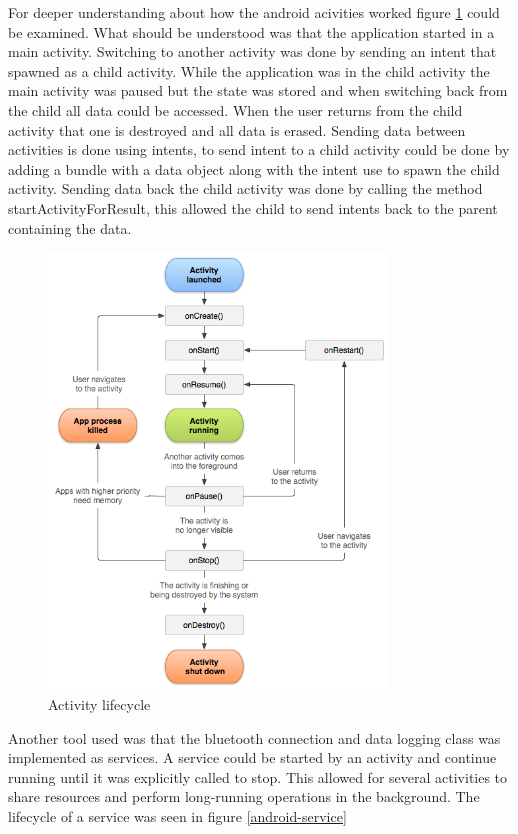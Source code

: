 For deeper understanding about how the android acivities\cite{activity} worked figure \ref{android-activity} could be examined. What should be understood was that the application started in a main activity. Switching to another activity was done by sending an intent that spawned as a child activity. While the application was in the child activity the main activity was paused but the state was stored and when switching back from the child all data could be accessed. When the user returns from the child activity that one is destroyed and all data is erased. Sending data between activities is done using intents, to send intent to a child activity could be done by adding a bundle with a data object along with the intent use to spawn the child activity. Sending data back the child activity was done by calling the method startActivityForResult, this allowed the child to send intents back to the parent containing the data. 
\begin{figure}[H]
\centering
\includegraphics[width=0.8\textwidth]{Figures/activity_lifecycle.png}
\caption{Activity lifecycle}
\label{android-activity}
\end{figure}
Another tool used was that the bluetooth connection and data logging class was implemented as services. A service\cite{service} could be started by an activity and continue running until it was explicitly called to stop. This allowed for several activities to share resources and perform long-running operations in the background. The lifecycle of a service was seen in figure \ref{android-service}

